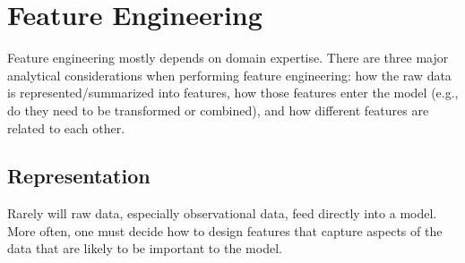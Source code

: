 \section{Feature Engineering}

Feature engineering mostly depends on domain expertise. There are three major analytical considerations when performing feature engineering: how the raw data is represented/summarized into features, how those features enter the model (e.g., do they need to be transformed or combined), and how different features are related to each other. 

\subsection{Representation}

Rarely will raw data, especially observational data, feed directly into a model. More often, one must decide how to design features that capture aspects of the data that are likely to be important to the model. 

\vspace{2mm}

